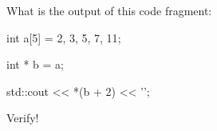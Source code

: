 What is the output of this code fragment:



\begin{consolethree}[escapeinside=||]

int a[5] = {2, 3, 5, 7, 11};

int * b = a;

std::cout << *(b + 2) << '\n';

\end{consolethree}



Verify!

